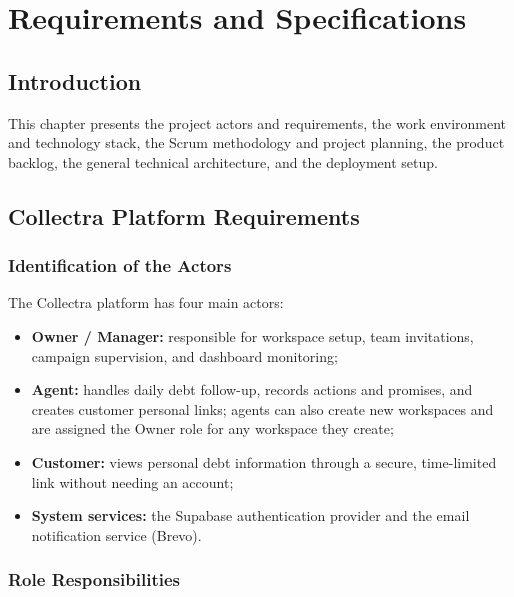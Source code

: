 \documentclass[12pt,a4paper]{report}
\begin{document}
\chapter{Requirements and Specifications}

\section*{Introduction}
{}

This chapter presents the project actors and requirements, the work environment and
technology stack, the Scrum methodology and project planning, the product backlog,
the general technical architecture, and the deployment setup.

\section{Collectra Platform Requirements}

\subsection{Identification of the Actors}

The Collectra platform has four main actors:
\begin{itemize}
  \item \textbf{Owner / Manager:} responsible for workspace setup, team invitations,
        campaign supervision, and dashboard monitoring;
  \item \textbf{Agent:} handles daily debt follow-up, records actions and promises,
        and creates customer personal links; agents can also create new workspaces
        and are assigned the Owner role for any workspace they create;
  \item \textbf{Customer:} views personal debt information through a secure,
        time-limited link without needing an account;
  \item \textbf{System services:} the Supabase authentication provider and the
        email notification service (Brevo).
\end{itemize}

\subsection{Role Responsibilities}
\end{document}
